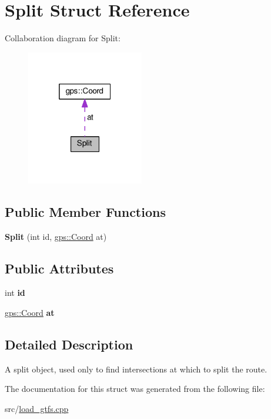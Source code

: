 \hypertarget{structSplit}{}\section{Split Struct Reference}
\label{structSplit}


Collaboration diagram for Split\+:
\nopagebreak
\begin{figure}[H]
\begin{center}
\leavevmode
\includegraphics[width=145pt]{structSplit__coll__graph}
\end{center}
\end{figure}
\subsection*{Public Member Functions}
\begin{DoxyCompactItemize}
\item 
{\bfseries Split} (int id, \hyperlink{classgps_1_1Coord}{gps\+::\+Coord} at)\hypertarget{structSplit_a947ee73498c31af7ff515d8959b4df5c}{}\label{structSplit_a947ee73498c31af7ff515d8959b4df5c}

\end{DoxyCompactItemize}
\subsection*{Public Attributes}
\begin{DoxyCompactItemize}
\item 
int {\bfseries id}\hypertarget{structSplit_a84312796ba8ea69c31b1e6e3e4daf9e5}{}\label{structSplit_a84312796ba8ea69c31b1e6e3e4daf9e5}

\item 
\hyperlink{classgps_1_1Coord}{gps\+::\+Coord} {\bfseries at}\hypertarget{structSplit_afccad445124ed317d515be1fa9600f53}{}\label{structSplit_afccad445124ed317d515be1fa9600f53}

\end{DoxyCompactItemize}


\subsection{Detailed Description}
A split object, used only to find intersections at which to split the route. 

The documentation for this struct was generated from the following file\+:\begin{DoxyCompactItemize}
\item 
src/\hyperlink{load__gtfs_8cpp}{load\+\_\+gtfs.\+cpp}\end{DoxyCompactItemize}
